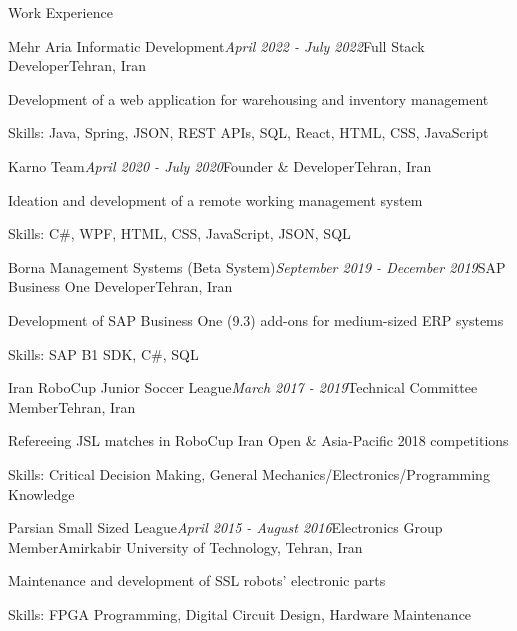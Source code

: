 \documentclass{resume} %
\begin{document}
\begin{rSection}{Work Experience}

  \begin{rSubsection}{Mehr Aria Informatic Development}{\em April 2022 - July 2022}{Full Stack Developer}{Tehran, Iran}
    \item Development of a web application for warehousing and inventory management
    \item Skills: Java, Spring, JSON, REST APIs, SQL, React, HTML, CSS, JavaScript
  \end{rSubsection}


  \begin{rSubsection}{Karno Team}{\em April 2020 - July 2020}{Founder \& Developer}{Tehran, Iran}
    \item Ideation and development of a remote working management system
    \item Skills: C\#, WPF, HTML, CSS, JavaScript, JSON, SQL
  \end{rSubsection}


  \begin{rSubsection}{Borna Management Systems (Beta System)}{\em September 2019 - December 2019}{SAP Business One Developer}{Tehran, Iran}
    \item Development of SAP Business One (9.3) add-ons for medium-sized ERP systems
    \item Skills: SAP B1 SDK, C\#, SQL
  \end{rSubsection}


  \begin{rSubsection}{Iran RoboCup Junior Soccer League}{\em March 2017 - 2019}{Technical Committee Member}{Tehran, Iran}
    \item Refereeing JSL matches in RoboCup Iran Open \& Asia-Pacific 2018 competitions
    \item Skills: Critical Decision Making, General Mechanics/Electronics/Programming Knowledge
  \end{rSubsection}


  \begin{rSubsection}{Parsian Small Sized League}{\em April 2015 - August 2016}{Electronics Group Member}{Amirkabir University of Technology, Tehran, Iran}
    \item Maintenance and development of SSL robots' electronic parts
    \item Skills: FPGA Programming, Digital Circuit Design, Hardware Maintenance
  \end{rSubsection}

\end{rSection}
\end{document}
